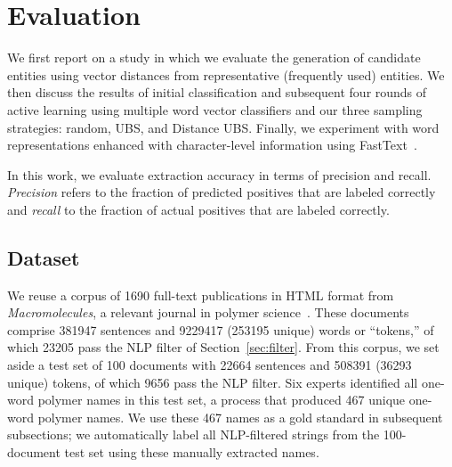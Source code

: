 \section{Evaluation}
\label{sect:apner_results}
We first report on a study in which we evaluate the generation of candidate entities using vector distances from representative (frequently used) entities. 
We then discuss the results of initial classification and subsequent four rounds of active learning using multiple word vector classifiers and our three sampling strategies: random, UBS, and Distance UBS.
Finally, we experiment with word representations enhanced with character-level information using FastText~\cite{bojanowski2016enriching,joulin2016bag}.

In this work, we evaluate extraction accuracy in terms of precision and recall.
\emph{Precision} refers to the fraction of predicted
positives that are labeled correctly and
\emph{recall} to the fraction of actual positives that
are labeled correctly.

\subsection{Dataset}\label{sec:dataset}

We reuse a corpus of \num{1690} full-text publications in HTML format from \textit{Macromolecules}, 
a relevant journal in polymer science~\cite{tchoua2019polyner}.
These documents comprise \num{381947} sentences and \num{9229417} (\num{253195} unique) words or ``tokens,''
of which \num{23205} pass the NLP filter of Section~\ref{sec:filter}.
From this corpus, 
we set aside a test set of 100 documents with  \num{22664} sentences and \num{508391} (\num{36293} unique) tokens,
of which \num{9656} pass the NLP filter.
Six experts identified all one-word polymer names in this test set,
a process that produced 467 unique one-word polymer names.
We use these 467 names as a gold standard in subsequent subsections; we automatically label all NLP-filtered strings from the 100-document test set using these manually extracted names.



